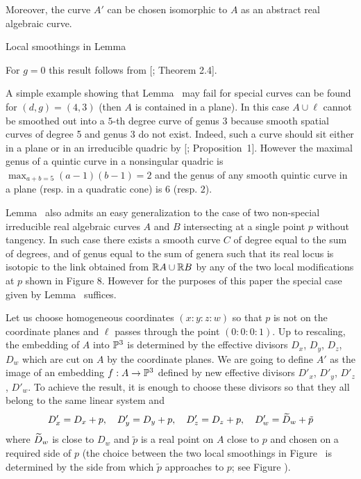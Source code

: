 Moreover, the curve $A'$ can be chosen isomorphic to $A$ as an abstract real algebraic curve. 
\endproclaim

\midinsert
\centerline{ \epsfxsize=50mm}
Local smoothings in Lemma \lemExistPrtrb
\endcaption
\endinsert

\roster
\item
For $g=0$ this result follows from [;  Theorem 2.4].
\smallskip\item
A simple example showing that Lemma \lemExistPrtrb\ may fail for special curves
can be found for $(d,g)=(4,3)$ (then $A$ is contained in a plane).
In this case $A\cup\ell$ cannot be smoothed out into a $5$-th degree curve of genus $3$ because
smooth spatial curves of degree 5 and genus 3 do not exist. Indeed, such a curve should sit either in
a plane or in an irreducible quadric by [; Proposition~1].
However the maximal genus of a quintic curve in a nonsingular quadric is
$\max_{a+b=5} (a-1)(b-1) = 2$ and the genus of any smooth quintic curve in a plane (resp. in a quadratic cone)
is $6$ (resp. $2$).
%
\smallskip\item
Lemma \lemExistPrtrb\ also admits an easy generalization to the case of two
non-special irreducible real algebraic curves $A$ and $B$ intersecting at a single
point $p$ without tangency. In such case there exists a smooth curve $C$ of
degree equal to the sum of degrees, and of genus equal to the sum of genera
such that its real locus is isotopic to the link obtained from $\R A\cup\R B$ by
any of the two local modifications at $p$ shown in Figure 8. However for the purposes
of this paper the special case given by Lemma \lemExistPrtrb\ suffices.
%
\endroster
\smallskip

Let us choose homogeneous coordinates $(x:y:z:w)$ so that $p$ is not on the coordinate planes and
$\ell$ passes through the point $(0:0:0:1)$.
Up to rescaling, the embedding of $A$ into $\P^3$ is determined by the effective divisors $D_x$, $D_y$,
$D_z$, $D_w$ which are cut on $A$ by the coordinate planes.
We are going to define $A'$ as the image of an embedding $f:A\to\P^3$ defined by new effective divisors
$D'_x$, $D'_y$, $D'_z$, $D'_w$. To achieve the result, it is enough to choose these divisors
so that they all belong to the same linear system and
$$
    D'_x = D_x+p,\quad D'_y=D_y+p,\quad D'_z=D_z+p,\quad D'_w = \wt D_w + \tilde p
$$
where $\wt D_w$ is close to $D_w$ and
$\tilde p$ is a real point on $A$ close
to $p$ and chosen on a required side of $p$ (the choice between the two local smoothings
in Figure \figSmoo\ is determined by the side from which $\tilde p$ approaches to $p$;
see Figure \figSmooG).

